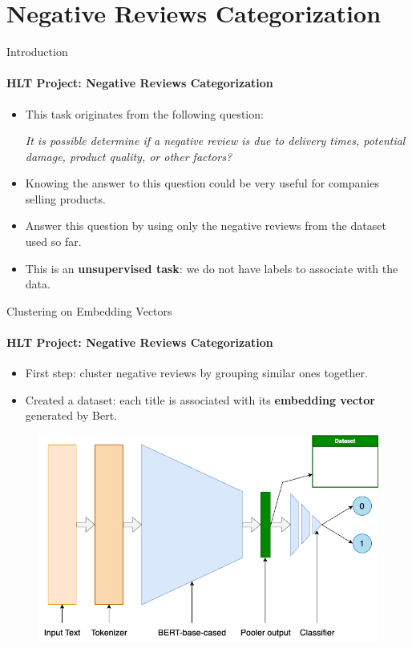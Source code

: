 \documentclass{beamer}
\theoremstyle{definition}
\theoremstyle{plain}
\begin{document}
\section{Negative Reviews Categorization}

\begin{frame}{Introduction}
\framesubtitle{HLT Project: Negative Reviews Categorization}
{\small
\begin{itemize}
    \item This task originates from the following question:
    \begin{center}
    \emph{It is possible determine if a negative review is due to delivery times, potential damage, product quality, or other factors?}
    \end{center}
    \item Knowing the answer to this question could be very useful for companies selling products.
    \item Answer this question by using only the negative reviews from the dataset used so far.
    \item This is an \textbf{unsupervised task}: we do not have labels to associate with the data.
\end{itemize}
}
\end{frame}


\begin{frame}{Clustering on Embedding Vectors}
\framesubtitle{HLT Project: Negative Reviews Categorization}
{\small
\begin{itemize}
\item First step: cluster negative reviews by grouping similar ones together.
\item Created a dataset: each title is associated with its \textbf{embedding vector} generated by Bert.
\end{itemize}
}

\begin{figure}
\centering
\includegraphics[scale=0.3]{Figures/Modello5.png}
\end{figure}

\end{frame}
\end{document}
